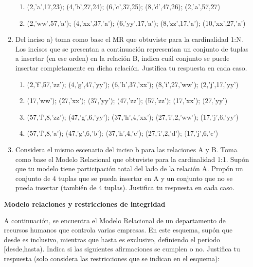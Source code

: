 \documentclass{exam}
\begin{document}
\begin{questions}
\begin{enumerate}[label=\alph*.]
\begin{enumerate}[label=\roman*.]
				\item (2,’a’,17,23); (4,’b’,27,24); (6,’c’,37,25); (8,’d’,47,26); (2,’a’,57,27)
				\item (2,’ww’,57,’a’); (4,’xx’,37,’a’); (6,’yy’,17,’a’); (8,’zz’,17,’a’); (10,’xx’,27,’a’)
\end{enumerate}
           \item Del inciso a) toma como base el MR que obtuviste para la cardinalidad 1:N. Los incisos que se presentan a
continuación representan un conjunto de tuplas a insertar (en ese orden) en la relación B, indica cuál conjunto se
puede insertar completamente en dicha relación. Justifica tu respuesta en cada caso.  
\begin{enumerate}[label=\roman*.]
				\item (2,’f’,57,’zz’); (4,’g’,47,’yy’); (6,’h’,37,’xx’); (8,’i’,27,’ww’); (2,’j’,17,’yy’)
				\item (17,’ww’); (27,’xx’); (37,’yy’); (47,’zz’); (57,’zz’); (17,’xx’); (27,’yy’)
				\item (57,’f’,8,’zz’); (47,’g’,6,’yy’); (37,’h’,4,’xx’); (27,’i’,2,’ww’); (17,’j’,6,’yy’)
				\item (57,’f’,8,’a’); (47,’g’,6,’b’); (37,’h’,4,’c’); (27,’i’,2,’d’); (17,’j’,6,’c’)
\end{enumerate}
			\item Considera el mismo escenario del inciso b para las relaciones A y B. Toma como base el Modelo Relacional que
obtuviste para la cardinalidad 1:1. Supón que tu modelo tiene participación total del lado de la relación A. Propón
un conjunto de 4 tuplas que se pueda insertar en A y un conjunto que no se pueda insertar (también de 4 tuplas).
Justifica tu respuesta en cada caso.
			\end{enumerate}
	
	\question \textbf{Modelo relaciones y restricciones de integridad}
	
	A continuación, se encuentra el Modelo Relacional de un departamento de recursos humanos que controla varias
empresas. En este esquema, supón que desde es inclusivo, mientras que hasta es exclusivo, definiendo el período
[desde,hasta). Indica si las siguientes afirmaciones se cumplen o no. Justifica tu respuesta (solo considera las
restricciones que se indican en el esquema):
	

\end{questions}
\end{document}
